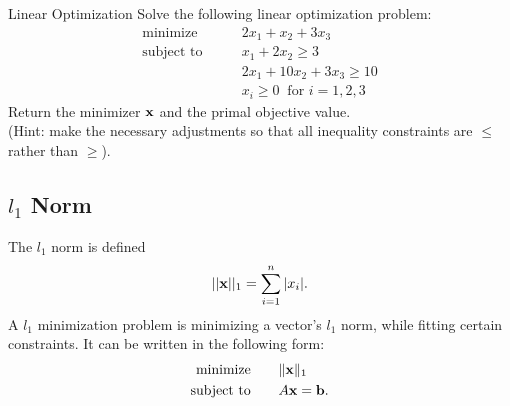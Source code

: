 
%

\begin{problem}{Linear Optimization}
Solve the following linear optimization problem:
\begin{align*}
\text{minimize}\qquad &2x_1+x_2+3x_3 \\
\text{subject to}\qquad &x_1+2x_2 \geq 3 \\
	        &2x_1+10x_2+3x_3 \geq 10 \\
		&x_i \geq 0  \ \text{ for } i=1,2,3
\end{align*}
Return the minimizer $\mathbf{x}$ and the primal objective value.
\\(Hint: make the necessary adjustments so that all inequality constraints are $\leq$ rather than $\geq$).
\end{problem}

\subsection*{$l_1$ Norm}
The $l_1$ norm is defined 
\[||\mathbf{x}||_1=\sum_{i=1}^n |x_i|.\]
A $l_1$ minimization problem is minimizing a vector's $l_1$ norm, while fitting certain constraints. It can be written in the following form:
\begin{align*}
\mbox{minimize}\qquad &\|\mathbf{x}\|_1\\
\mbox{subject to} \qquad &A\mathbf{x} = \mathbf{b}.
\end{align*}

